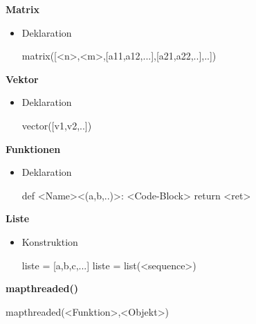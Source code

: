 \documentclass[a4paper,9pt,DIV15,twocolumn]{scrartcl}
\begin{document}
\textbf{Matrix}
\begin{itemize}
\item Deklaration
\begin{sagein}
matrix([<n>,<m>,[a11,a12,...],[a21,a22,..],..])
\end{sagein}
\end{itemize}

\textbf{Vektor}
\begin{itemize}
 \item Deklaration
\begin{sagein}
vector([v1,v2,..]) 
\end{sagein}
\end{itemize}

\textbf{Funktionen}
\begin{itemize}
 \item Deklaration
\begin{sagein}
def <Name><(a,b,..)>:
    <Code-Block>
    return <ret>
\end{sagein}
\end{itemize}

\textbf{Liste}
\begin{itemize}
 \item Konstruktion
\begin{sagein}
liste = [a,b,c,...] 
liste = list(<sequence>)
\end{sagein}
\end{itemize}

\textbf{mapthreaded()}
\begin{sagein}
 mapthreaded(<Funktion>,<Objekt>)
\end{sagein}
\end{document}
